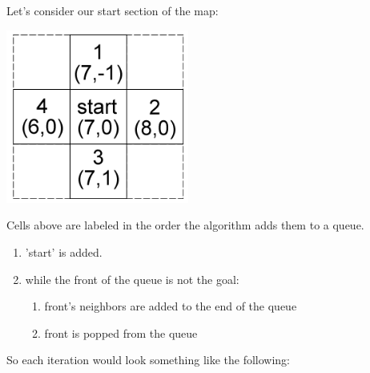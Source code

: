 \documentclass[12pt]{article}
\begin{document}
	Let's consider our start section of the map:
	\begin{center} \includegraphics[width=60mm]{images/init_pos.png} \end{center}
	Cells above are labeled in the order the algorithm adds them to a queue.
	\begin{enumerate}
		\item 'start' is added.
		\item while the front of the queue is not the goal:
		\begin{enumerate}
			\item front's neighbors are added to the end of the queue
			\item front is popped from the queue
		\end{enumerate}
	\end{enumerate}
	So each iteration would look something like the following:
	\\ \\
\end{document}
